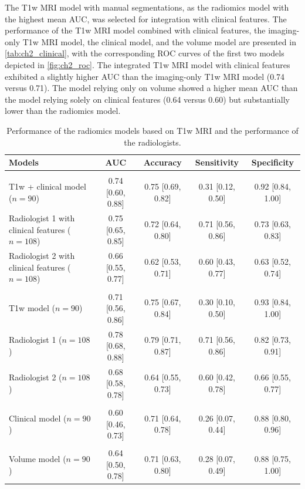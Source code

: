 The T1w MRI model with manual segmentations, as the radiomics model with the highest mean AUC, was selected for integration with clinical features.
The performance of the T1w MRI model combined with clinical features, the imaging-only T1w MRI model, the clinical model, and the volume model are presented in \autoref{tab:ch2_clinical}, with the corresponding ROC curves of the first two models depicted in \autoref{fig:ch2_roc}.
The integrated T1w MRI model with clinical features exhibited a slightly higher AUC than the imaging-only T1w MRI model (0.74 versus 0.71).
The model relying only on volume showed a higher mean AUC than the model relying solely on clinical features (0.64 versus 0.60) but substantially lower than the radiomics model.

\begin{table}[htbp]
	\caption{Performance of the radiomics models based on T1w MRI and the performance of the radiologists.}
	\label{tab:ch2_clinical}
	\footnotesize
	\setlength{\tabcolsep}{4pt}
	\begin{tabular}{@{}>{\raggedright\arraybackslash}p{3.3cm}cccc@{}}
		\toprule
		\textbf{Models} & \textbf{AUC} & \textbf{Accuracy} & \textbf{Sensitivity} & \textbf{Specificity} \\
		\midrule
		\multicolumn{5}{@{}l}{\textit{\textbf{Imaging + Clinical features}}} \\
		T1w + clinical model ($n = 90$) & 0.74 [0.60, 0.88] & 0.75 [0.69, 0.82] & 0.31 [0.12, 0.50] & 0.92 [0.84, 1.00] \\
		Radiologist 1 with clinical features ($n = 108$) & 0.75 [0.65, 0.85] & 0.72 [0.64, 0.80] & 0.71 [0.56, 0.86] & 0.73 [0.63, 0.83] \\
		Radiologist 2 with clinical features ($n = 108$) & 0.66 [0.55, 0.77] & 0.62 [0.53, 0.71] & 0.60 [0.43, 0.77] & 0.63 [0.52, 0.74] \\
		\midrule
		\multicolumn{5}{@{}l}{\textit{\textbf{Imaging only}}} \\
		T1w model ($n = 90$) & 0.71 [0.56, 0.86] & 0.75 [0.67, 0.84] & 0.30 [0.10, 0.50] & 0.93 [0.84, 1.00] \\
		Radiologist 1 ($n = 108$) & 0.78 [0.68, 0.88] & 0.79 [0.71, 0.87] & 0.71 [0.56, 0.86] & 0.82 [0.73, 0.91] \\
		Radiologist 2 ($n = 108$) & 0.68 [0.58, 0.78] & 0.64 [0.55, 0.73] & 0.60 [0.42, 0.78] & 0.66 [0.55, 0.77] \\
		\midrule
		\multicolumn{5}{@{}l}{\textit{\textbf{Clinical features only}}} \\
		Clinical model ($n = 90$) & 0.60 [0.46, 0.73] & 0.71 [0.64, 0.78] & 0.26 [0.07, 0.44] & 0.88 [0.80, 0.96] \\
		\midrule
		\multicolumn{5}{@{}l}{\textit{\textbf{Volume only}}} \\
		Volume model ($n = 90$) & 0.64 [0.50, 0.78] & 0.71 [0.63, 0.80] & 0.28 [0.07, 0.49] & 0.88 [0.75, 1.00] \\
		\bottomrule
	\end{tabular}


\end{table}
